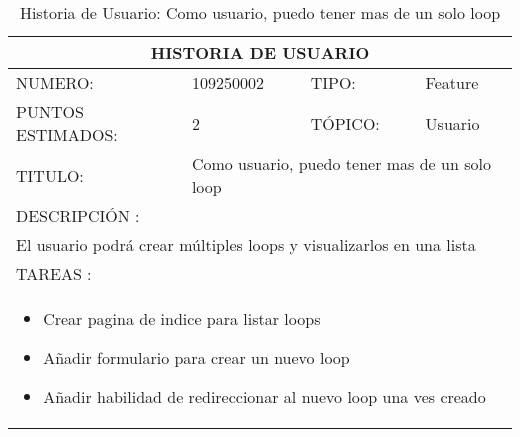 \begin{table}[h]
\centering
\renewcommand{\arraystretch}{1.4}
\begin{tabular}{|*{4}{l|}}
\hline
\multicolumn{4}{|c|}{HISTORIA DE USUARIO} \\ \hline
NUMERO: & 109250002 & TIPO: & Feature \\ \hline
PUNTOS ESTIMADOS: & 2 & TÓPICO: & Usuario \\ \hline
TITULO: & \multicolumn{3}{|p{7.2cm}|}{Como usuario, puedo tener mas de un solo loop} \\ \hline
\multicolumn{4}{|l|}{DESCRIPCIÓN : } \\ \hline
\multicolumn{4}{|p{11cm}|}{El usuario podrá crear múltiples loops y visualizarlos en una lista} \\ \hline
\multicolumn{4}{|l|}{TAREAS : } \\ \hline
\multicolumn{4}{|p{11cm}|}{
\begin{minipage}[t]{\hsize}
  \begin{itemize}
    \item Crear pagina de indice para listar loops
    \item Añadir formulario para crear un nuevo loop
    \item Añadir habilidad de redireccionar al nuevo loop una ves creado
  \end{itemize}
\end{minipage}
} \\ \hline
\end{tabular}
\caption{Historia de Usuario: Como usuario, puedo tener mas de un solo loop}
\label{tab:Primero}
\end{table}

